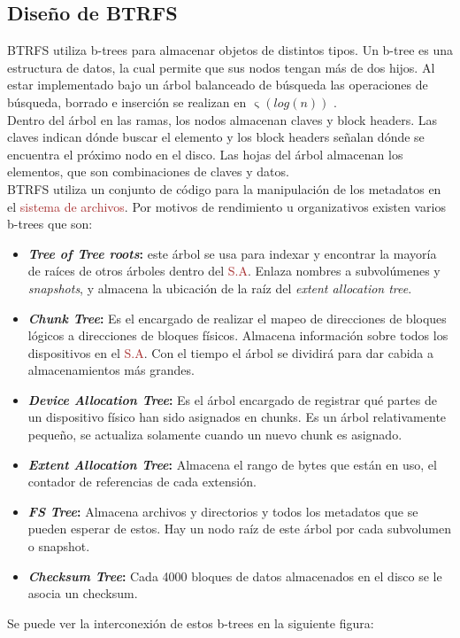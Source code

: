 \subsection{Diseño de BTRFS}
BTRFS utiliza b-trees para almacenar objetos de distintos tipos. Un b-tree es una estructura de datos, la cual permite que sus nodos tengan más de dos hijos. Al estar implementado bajo un árbol balanceado de búsqueda las operaciones de búsqueda, borrado e inserción se realizan en
\begin{math}
\mathrm{\upvarsigma}(log(n))
\end{math}
\cite{henson}.
\\

Dentro del árbol en las ramas, los nodos almacenan claves y block headers. Las claves  indican dónde buscar el elemento y los block headers señalan dónde se encuentra el próximo nodo en el disco.
Las hojas del árbol almacenan los elementos, que son combinaciones de claves y datos.
\\

BTRFS utiliza un conjunto de código para la manipulación de los metadatos en el \textcolor{brown}{sistema de archivos}. Por motivos de rendimiento u organizativos existen varios b-trees \cite{btrees} que son:
\begin{itemize}
    \item \textbf{\textit{Tree of Tree roots}:} este árbol se usa para indexar  y encontrar la mayoría de raíces de otros árboles dentro del \textcolor{brown}{S.A}. Enlaza nombres a subvolúmenes y \textit{snapshots}, y almacena la ubicación de la raíz del \textit{extent allocation tree}. 
    \item \textbf{\textit{Chunk Tree}:} Es el encargado de realizar el mapeo de direcciones de bloques lógicos a direcciones de bloques físicos. Almacena información sobre todos los dispositivos en el \textcolor{brown}{S.A}. Con el tiempo el árbol se dividirá para dar cabida a almacenamientos más grandes.
    \item \textbf{\textit{Device Allocation Tree}:} Es el árbol encargado de registrar qué partes de un dispositivo físico han sido asignados en chunks. Es un árbol relativamente pequeño, se actualiza solamente cuando un nuevo chunk es asignado. 
    \item \textbf{\textit{Extent Allocation Tree}:} Almacena el rango de bytes que están en uso, el contador de referencias de cada extensión.
    \item \textbf{\textit{FS Tree}:} Almacena archivos y directorios y todos los metadatos que se pueden esperar de estos. Hay un nodo raíz de este árbol por cada subvolumen o snapshot.
    \item \textbf{\textit{Checksum Tree}:} Cada 4000 bloques de datos almacenados en el disco se le asocia un checksum.
\end{itemize}
\newpage
Se puede ver la interconexión de estos b-trees en la siguiente figura: 

